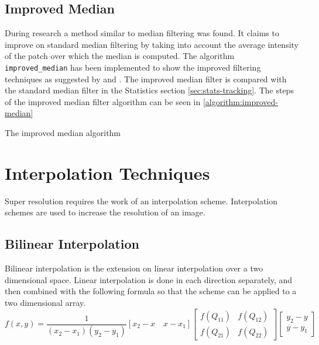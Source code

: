 \documentclass{article}
\begin{document}
\subsection{Improved Median}
\label{subsec:improved-median}
%
During research a method similar to median filtering was found. It
claims to improve on standard median filtering by taking into account
the average intensity of the patch over which the median is
computed. The algorithm \texttt{improved\_median} has been implemented
to show the improved filtering techniques as suggested by
\cite{improved-median} and \cite{Med2012}. The improved median filter
is compared with the standard median filter in the Statistics section
\ref{sec:stats-tracking}. The steps of the improved median filter
algorithm can be seen in \ref{algorithm:improved-median} \par
%
\begin{algorithm}[t]
  \caption{The improved median algorithm}
  \label{algorithm:improved-median}
\end{algorithm}
%
\section{Interpolation Techniques}
\label{sec:interp-techs}
Super resolution requires the work of an interpolation
scheme. Interpolation schemes are used to increase the resolution of
an image.
\subsection{Bilinear Interpolation}
\label{subsec:bilinear}
Bilinear interpolation is the extension on linear interpolation over a
two dimensional space. Linear interpolation is done in each direction
separately, and then combined with the following formula so that the
scheme can be applied to a two dimensional array.
\[f(x, y) = \frac{1}{(x_2 - x_1)(y_2-y_1)} [x_2-x \quad x - x_1]
\begin{bmatrix} f(Q_{11}) & f(Q_{12}) \\ f(Q_{21}) & f(Q_{22}) \end{bmatrix} \begin{bmatrix} y_2 - y \\ y-y_1 \end{bmatrix}\]
\end{document}

